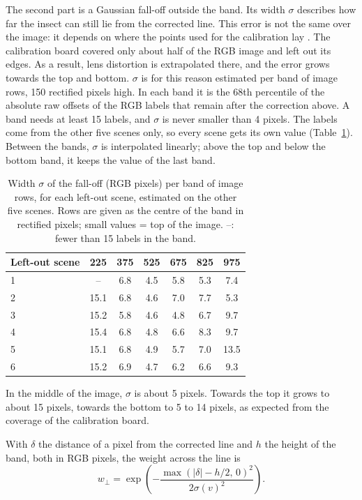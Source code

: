 The second part is a Gaussian fall-off outside the band. Its width $\sigma$ describes how far the insect can 
still lie from the corrected line. This error is not the same over the image: it depends on where the points
used for the calibration lay \parencite{zhang_determining_1998}. The calibration board covered only about half
of the RGB image and left out its edges. As a result, lens distortion is extrapolated there, and the error grows
towards the top and bottom. $\sigma$ is for this reason estimated per band of image rows, 150 rectified pixels
high. In each band it is the 68th percentile of the absolute raw offsets of the RGB labels that remain after the 
correction above. A band needs at least 15 labels, and $\sigma$ is never smaller than 4 pixels. The labels come 
from the other five scenes only, so every scene gets its own value (Table~\ref{tab:zone-sigma}). Between the 
bands, $\sigma$ is interpolated linearly; above the top and below the bottom band, it keeps the value of the last
band.

\begin{table}[ht]
    \centering
    \caption{Width $\sigma$ of the fall-off (RGB pixels) per band of image rows,
    for each left-out scene, estimated on the other five scenes. Rows are given as
    the centre of the band in rectified pixels; small values = top of the image.
    --: fewer than 15 labels in the band.}
    \label{tab:zone-sigma}
    \small
    \begin{tabular}{lcccccc}
        \hline
        Left-out scene & 225 & 375 & 525 & 675 & 825 & 975 \\
        \hline
        1 & -- & 6.8 & 4.5 & 5.8 & 5.3 & 7.4 \\
        2 & 15.1 & 6.8 & 4.6 & 7.0 & 7.7 & 5.3 \\
        3 & 15.2 & 5.8 & 4.6 & 4.8 & 6.7 & 9.7 \\
        4 & 15.4 & 6.8 & 4.8 & 6.6 & 8.3 & 9.7 \\
        5 & 15.1 & 6.8 & 4.9 & 5.7 & 7.0 & 13.5 \\
        6 & 15.2 & 6.9 & 4.7 & 6.2 & 6.6 & 9.3 \\
        \hline
    \end{tabular}
\end{table}

In the middle of the image, $\sigma$ is about 5 pixels. Towards the top it grows to about 15 pixels, towards the
bottom to 5 to 14 pixels, as expected from the coverage of the calibration board.

With $\delta$ the distance of a pixel from the corrected line and $h$ the height of the band, both in RGB pixels,
the weight across the line is
\begin{equation}
    w_\perp = \exp\!\left( -\frac{\max\left(|\delta| - h/2,\, 0\right)^2}{2\sigma(v)^2} \right).
\end{equation}

